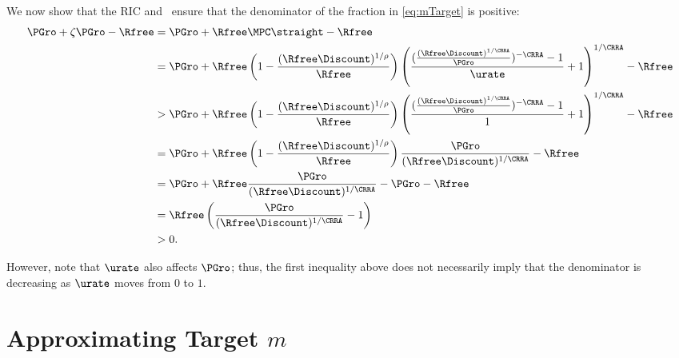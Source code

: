 \documentclass{\handout}
\begin{document}
We now show that the RIC and \GICPGro~ensure that the denominator of the fraction in \eqref{eq:mTarget} is positive: 
\begin{equation*}\begin{gathered}\begin{aligned}
\PGro + \zeta \PGro - \Rfree & =  \PGro + \Rfree \MPCU \straight - \Rfree
 \\& =  \PGro + \Rfree \left(1- \frac{(\Rfree \Discount)^{1/\rho}}{\Rfree}\right) \left(\frac{(\frac{(\Rfree\Discount)^{1/\CRRA}}{\PGro})^{-\CRRA}-1}{\urate}+1\right)^{1/\CRRA}-\Rfree
 \\& >   \PGro+\Rfree \left(1-\frac{(\Rfree\Discount)^{1/\rho}}{\Rfree}\right)
\left(\frac{(\frac{(\Rfree\Discount)^{1/\CRRA}}{\PGro})^{-\CRRA}-1}{1}+1\right)^{1/\CRRA}-\Rfree
 \\& =  \PGro+\Rfree\left(1-\frac{(\Rfree\Discount)^{1/\rho}}{\Rfree}\right)\frac{\PGro}{(\Rfree\Discount)^{1/\CRRA}}-\Rfree
 \\& =  \PGro+\Rfree \frac{\PGro}{(\Rfree\Discount)^{1/\CRRA}}- \PGro - \Rfree
 \\& =  \Rfree \left(\frac{\PGro}{(\Rfree\Discount)^{1/\CRRA}}-1\right)
 \\& >  0.
\end{aligned}\end{gathered}\end{equation*}

However, note that $\urate$ also affects $\PGro$; thus, the first inequality above does
not necessarily imply that the denominator is decreasing as $\urate$ moves from $0$ to $1$.


\section{Approximating Target $m$}
\end{document}
